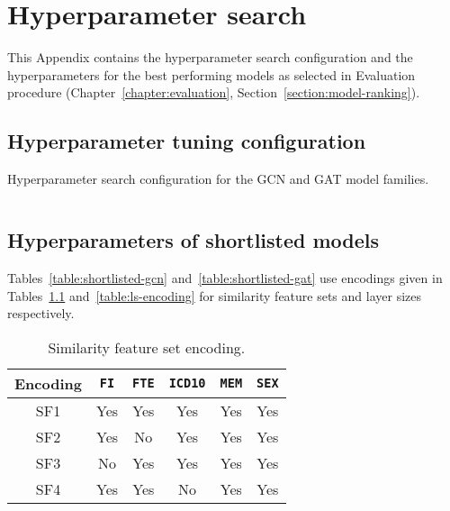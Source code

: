 \chapter{Hyperparameter search}
\label{appendix:hyperparameters}

This Appendix contains the hyperparameter search configuration and the hyperparameters for the best performing models as selected in Evaluation procedure (Chapter~\ref{chapter:evaluation}, Section~\ref{section:model-ranking}).

\section{Hyperparameter tuning configuration}

\bigskip
\begin{code}
\caption{Hyperparameter search configuration for the GCN and GAT model families.}
\label{listing:sweep-config}
\medskip
\inputminted[frame=bottomline, linenos, breaklines=true, numberblanklines=false, style=colorful]{yaml}{code/sweep_config.yaml}
\end{code}

\section{Hyperparameters of shortlisted models}
Tables~\ref{table:shortlisted-gcn} and~\ref{table:shortlisted-gat} use encodings given in Tables~\ref{table:sf-encoding} and~\ref{table:ls-encoding} for similarity feature sets and layer sizes respectively.

\begin{table}[h]
    \caption{Similarity feature set encoding.}\label{table:sf-encoding}
    \centering
    \small
    \begin{tabular}{cccccc}
        \hline
    \textbf{Encoding} & \texttt{FI} &  \texttt{FTE}& \texttt{ICD10}& \texttt{MEM}& \texttt{SEX}\\  \hline
        SF1 & Yes & Yes & Yes & Yes & Yes \\
        SF2 & Yes & No & Yes & Yes & Yes \\
        SF3 & No & Yes & Yes & Yes & Yes \\
        SF4 & Yes & Yes & No & Yes & Yes \\ \hline
\end{tabular}
\end{table}

